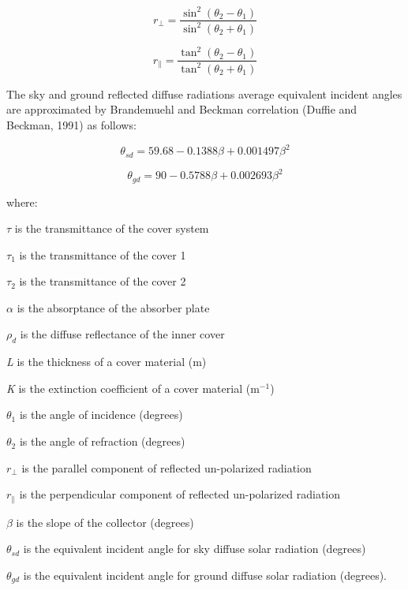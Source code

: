\begin{equation}
{r_ \bot } = \frac{{{{\sin }^2}\left( {{\theta_2} - {\theta_1}} \right)}}{{{{\sin }^2}\left( {{\theta_2} + {\theta_1}} \right)}}
\end{equation}

\begin{equation}
{r_\parallel } = \frac{{{{\tan }^2}\left( {{\theta_2} - {\theta_1}} \right)}}{{{{\tan }^2}\left( {{\theta_2} + {\theta_1}} \right)}}
\end{equation}

The sky and ground reflected diffuse radiations average equivalent incident angles are approximated by Brandemuehl and Beckman correlation (Duffie and Beckman, 1991) as follows:

\begin{equation}
{\theta_{sd}} = 59.68 - 0.1388\beta  + 0.001497{\beta ^2}
\end{equation}

\begin{equation}
{\theta_{gd}} = 90 - 0.5788\beta  + 0.002693{\beta ^2}
\end{equation}

where:

\({\tau}\) is the transmittance of the cover system

\({\tau}_{1}\) is the transmittance of the cover 1

\({\tau}_{2}\) is the transmittance of the cover 2

\({\alpha}\) is the absorptance of the absorber plate

\({\rho}_{d}\) is the diffuse reflectance of the inner cover

\emph{L} is the thickness of a cover material (m)

\emph{K} is the extinction coefficient of a cover material (m\(^{-1}\))

\({\theta}_{1}\) is the angle of incidence (degrees)

\({\theta}_{2}\) is the angle of refraction (degrees)

\({r_ \bot }\) is the parallel component of reflected un-polarized radiation

\({r_\parallel }\) is the perpendicular component of reflected un-polarized radiation

\({\beta}\) is the slope of the collector (degrees)

\({\theta}_{sd}\) is the equivalent incident angle for sky diffuse solar radiation (degrees)

\({\theta}_{gd}\) is the equivalent incident angle for ground diffuse solar radiation (degrees).


